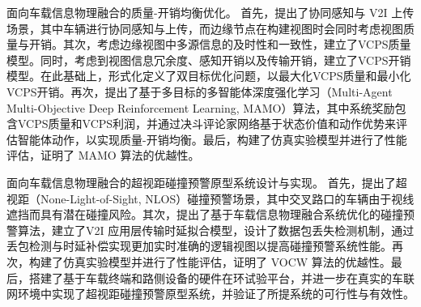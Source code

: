 \begin{cabstract}
 面向车载信息物理融合的质量-开销均衡优化。
首先，提出了协同感知与 V2I 上传场景，其中车辆进行协同感知与上传，而边缘节点在构建视图时会同时考虑视图质量与开销。其次，考虑边缘视图中多源信息的及时性和一致性，建立了VCPS质量模型。同时，考虑到视图信息冗余度、感知开销以及传输开销，建立了VCPS开销模型。在此基础上，形式化定义了双目标优化问题，以最大化VCPS质量和最小化VCPS开销。再次，提出了基于多目标的多智能体深度强化学习（Multi-Agent Multi-Objective Deep Reinforcement Learning, MAMO）算法，其中系统奖励包含VCPS质量和VCPS利润，并通过决斗评论家网络基于状态价值和动作优势来评估智能体动作，以实现质量-开销均衡。最后，构建了仿真实验模型并进行了性能评估，证明了 MAMO 算法的优越性。

 面向车载信息物理融合的超视距碰撞预警原型系统设计与实现。
首先，提出了超视距（None-Light-of-Sight, NLOS）碰撞预警场景，其中交叉路口的车辆由于视线遮挡而具有潜在碰撞风险。其次，提出了基于车载信息物理融合系统优化的碰撞预警算法，建立了V2I 应用层传输时延拟合模型，设计了数据包丢失检测机制，通过丢包检测与时延补偿实现更加实时准确的逻辑视图以提高碰撞预警系统性能。再次，构建了仿真实验模型并进行了性能评估，证明了 VOCW 算法的优越性。最后，搭建了基于车载终端和路侧设备的硬件在环试验平台，并进一步在真实的车联网环境中实现了超视距碰撞预警原型系统，并验证了所提系统的可行性与有效性。

\end{cabstract}


